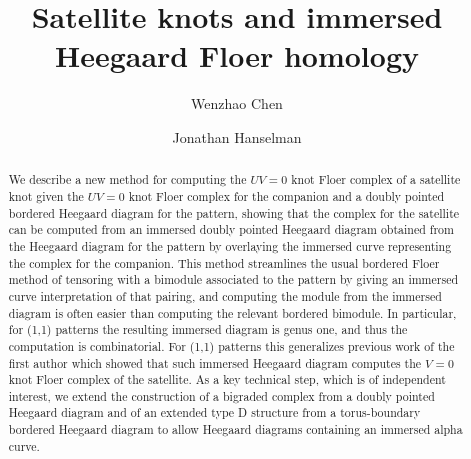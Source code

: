 \documentclass{amsart}
\theoremstyle{definition}
\theoremstyle{remark}
\numberwithin{equation}{section}
\numberwithin{equation}{section} \makeatletter
\begin{document}
\title[Satellite knots and immersed Heegaard Floer homology]{Satellite knots and immersed Heegaard Floer homology}



\author[Wenzhao Chen]{Wenzhao Chen}
\address {Department of Mathematics, University of British Columbia.\newline \it{E-mail address:} \tt{chenwzhao@math.ubc.ca}}

\author[Jonathan Hanselman]{Jonathan Hanselman}
\address {Department of Mathematics, Princeton University.\newline \it{E-mail address:} \tt{jh66@princeton.edu}}


\begin{abstract}
We describe a new method for computing the $UV = 0$ knot Floer complex of a satellite knot given the $UV = 0$ knot Floer complex 
for the companion and a doubly pointed bordered Heegaard diagram for the pattern, showing that the complex for the satellite can be computed from an immersed doubly pointed Heegaard diagram obtained from the Heegaard diagram for the pattern by overlaying the immersed curve representing the complex for the companion. This method streamlines the usual bordered Floer method of tensoring with a bimodule associated to the pattern by giving an immersed curve interpretation of that pairing, and computing the module from the immersed diagram is often easier than computing the relevant bordered bimodule. In particular, for (1,1) patterns the resulting immersed diagram is genus one, and thus the computation is combinatorial. For (1,1) patterns this generalizes previous work of the first author which showed that such immersed Heegaard diagram computes the $V=0$ knot Floer complex of the satellite. As a key technical step, which is of independent interest, we extend the construction of a bigraded complex from a doubly pointed Heegaard diagram and of an extended type D structure from a torus-boundary bordered Heegaard diagram to allow Heegaard diagrams containing an immersed alpha curve.
\end{abstract}

\maketitle
\tableofcontents
\end{document}
